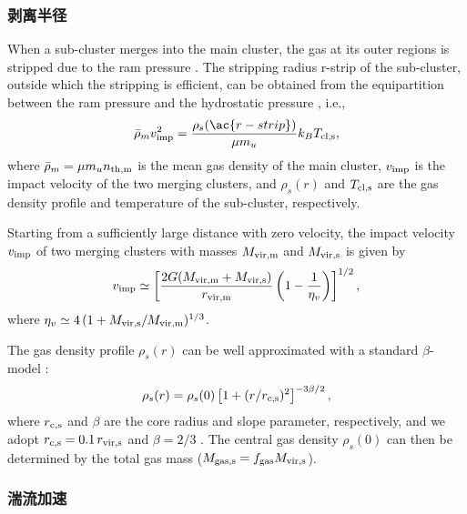 \subsubsection{剥离半径}

When a sub-cluster merges into the main cluster, the gas at its outer
regions is stripped due to the ram pressure \cite{gunn1972}.
The stripping radius \ac{r-strip} of the sub-cluster, outside which the
stripping is efficient, can be obtained from the equipartition between
the ram pressure and the hydrostatic pressure \cite{cassano2005}, i.e.,
\begin{equation}
  \label{eq:rs-eqp}
  \bar{\rho}_m v_{\R{imp}}^2
    = \frac{\rho_s(\ac{r-strip})}{\mu m_u} k_B T_{\R{cl,s}},
\end{equation}
where
$\bar{\rho}_m = \mu m_u n_{\mathrm{th,m}}$ is the mean gas density of the main
cluster,
$v_{\mathrm{imp}}$ is the impact velocity of the two merging clusters,
and $\rho_s(r)$ and $T_{\mathrm{cl,s}}$ are the gas density profile and
temperature of the sub-cluster, respectively.

Starting from a sufficiently large distance with zero velocity,
the impact velocity $v_{\mathrm{imp}}$ of two merging clusters with
masses $M_{\mathrm{vir,m}}$ and $M_{\mathrm{vir,s}}$ is given by
\cite{sarazin2002,cassano2005}
\begin{equation}
  \label{eq:v-imp}
  v_{\mathrm{imp}} \simeq \left[
    \frac{2G (M_{\mathrm{vir,m}} + M_{\mathrm{vir,s}})}{r_{\mathrm{vir,m}}}
    \left( 1 - \frac{1}{\eta_v} \right)\right]^{1/2},
\end{equation}
where $\eta_v \simeq 4 \,(1 + M_{\mathrm{vir,s}}/M_{\mathrm{vir,m}})^{1/3}$.

The gas density profile $\rho_s(r)$ can be well approximated with
a standard $\beta$-model \cite{cavaliere1976}:
\begin{equation}
  \label{eq:beta-model}
  \rho_s(r) = \rho_s(0) \left[1 + (r / r_{\mathrm{c,s}})^2 \right]^{-3\beta/2},
\end{equation}
where
$r_{\mathrm{c,s}}$ and $\beta$ are the core radius and slope parameter,
respectively, and we adopt $r_{\mathrm{c,s}} = 0.1 \,r_{\mathrm{vir,s}}$
\cite{sanderson2003} and
$\beta = 2/3$ \cite{jones1984}.
The central gas density $\rho_s(0)$ can then be determined by the total gas
mass ($M_{\mathrm{gas,s}} = f_{\mathrm{gas}} M_{\mathrm{vir,s}}$).

\subsubsection{湍流加速}

